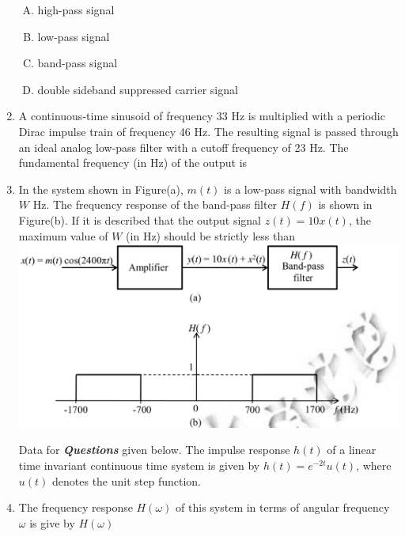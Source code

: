 \documentclass[journal,12pt,twocolumn]{IEEEtran}
\begin{document}
\begin{enumerate}[1.]
\begin{enumerate}[(A)]

\setlength\itemsep{1em}

\item high-pass signal
\item low-pass signal
\item band-pass signal
\item double sideband suppressed carrier signal
\end{enumerate}





\item A continuous-time sinusoid of frequency 33 Hz is multiplied with a periodic Dirac impulse train of frequency 46 Hz. The resulting signal is passed through an ideal analog low-pass filter with a cutoff frequency of 23 Hz. The fundamental frequency (in Hz) of the output is \underline{\hspace{2cm}}

\item In the system shown in Figure(a), $m(t)$ is a low-pass signal with bandwidth $W$ Hz. The frequency response of the band-pass filter $H(f)$ is shown in Figure(b). If it is described that the output signal $z(t)=10x(t)$, the maximum value of $W$ (in Hz) should be strictly less than \underline{\hspace{2cm}}\\
\includegraphics[scale=0.2]{fig17.eps}


Data for \textbf{\textit{Questions}} given below.\newline
\hspace{1em}The impulse response $h(t)$ of a linear time invariant continuous time system is given by $h(t)=e^{-2t}u(t)$, where $u(t)$ denotes the unit step function.\newline
\item The frequency response $H(\omega)$ of this system in terms of angular frequency $\omega$ is give by $H(\omega)$ 




\end{enumerate}
\end{document}
